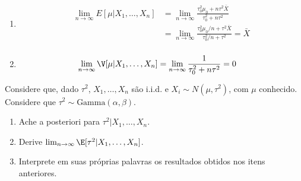 {\begin{enumerate}[label=(\alph*)]
  \item
  \begin{align*}
   \lim_{n \rightarrow \infty}E[\mu|X_{1},\ldots,X_{n}]	
   &= \lim_{n \rightarrow \infty}
   \frac{\tau_{0}^{2}\mu_{0}+n\tau^{2}\bar{X}}
   {\tau_{0}^{2}+n\tau^{2}} \\
   &= \lim_{n \rightarrow \infty}
   \frac{\tau_{0}^{2}\mu_{0}/n +\tau^{2}\bar{X}}
   {\tau_{0}^{2}/n +\tau^{2}} = \bar{X} \\
  \end{align*}

  \item 
  \begin{align*}
   \lim_{n \rightarrow \infty}
   \V[\mu|X_{1},\ldots,X_{n}]
   &= \lim_{n \rightarrow \infty}
   \frac{1}{\tau_{0}^{2}+n\tau^{2}} = 0
  \end{align*}
 \end{enumerate}
}{}

\begin{exercise}
 Considere que, dado $\tau^{2}$,
 $X_{1},\ldots,X_{n}$ são i.i.d. e
 $X_{i} \sim N(\mu,\tau^{2})$, com
 $\mu$ conhecido. Considere que
 $\tau^{2} \sim \text{Gamma}(\alpha,\beta)$.
 \begin{enumerate}[label=(\alph*)]
  \item Ache a posteriori para
  $\tau^{2}|X_{1},\ldots,X_{n}$.
  \item Derive $\lim_{n \rightarrow \infty}\E[\tau^{2}|X_{1},\ldots,X_{n}]$.
  \item Interprete em suas próprias palavras os
  resultados obtidos nos itens anteriores.
 \end{enumerate}
\end{exercise}

